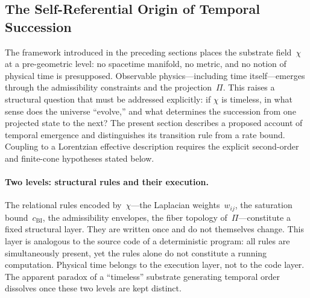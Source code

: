 \subsection{The Self-Referential Origin of Temporal Succession}
  \label{sec:temporal-succession}

  The framework introduced in the preceding sections places the substrate field~$\chi$
  at a pre-geometric level: no spacetime manifold, no metric, and no notion of physical time is presupposed.
  Observable physics---including time itself---emerges through the admissibility constraints and the projection~$\Pi$.
  This raises a structural question that must be addressed explicitly:
  if $\chi$ is timeless, in what sense does the universe ``evolve,'' and what
  determines the succession from one projected state to the next?
  The present section describes a proposed account of temporal emergence and distinguishes its
  transition rule from a rate bound.
  Coupling to a Lorentzian effective description requires the explicit second-order and finite-cone
  hypotheses stated below.

  \paragraph{Two levels: structural rules and their execution.}
    The relational rules encoded by~$\chi$---the Laplacian weights~$w_{ij}$,
    the saturation bound~$c_{\mathrm{BI}}$, the admissibility envelopes, the fiber
    topology of~$\Pi$---constitute a fixed structural layer.
    They are written once and do not themselves change.
    This layer is analogous to the source code of a deterministic program:
    all rules are simultaneously present, yet the rules alone do not constitute a running computation.
    Physical time belongs to the execution layer, not to the code layer.
    The apparent paradox of a ``timeless'' substrate generating temporal order
    dissolves once these two levels are kept distinct.


